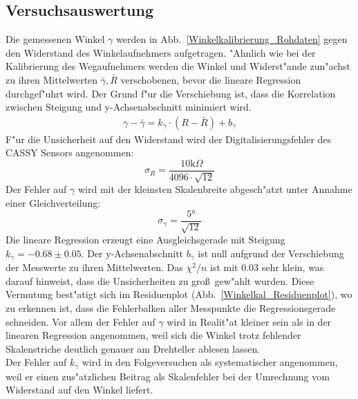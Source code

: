 \documentclass[12pt,a4paper]{article}
\begin{document}
\subsection{Versuchsauswertung}
Die gemessenen Winkel $\gamma$ werden in Abb.~\ref{Winkelkalibrierung_Rohdaten} gegen den Widerstand des Winkelaufnehmers aufgetragen. "Ahnlich wie bei der Kalibrierung des Wegaufnehmers werden die Winkel und Widerst"ande zun"achst zu ihren Mittelwerten $\bar{\gamma},\bar{R}$ verschobenen, bevor die lineare Regression durchgef"uhrt wird. Der Grund f"ur die Verschiebung ist, dass die Korrelation zwischen Steigung und y-Achsenabschnitt minimiert wird.
\begin{align}\label{eq:Winkelkal}
\gamma-\bar{\gamma}=k_{\gamma}\cdot (R-\bar{R}) + b_{\gamma}
\end{align}
F"ur die Unsicherheit auf den Widerstand wird der Digitalisierungsfehler des CASSY Sensors angenommen:
\begin{equation}
\sigma_R=\frac{10\text{k}\Omega}{4096\cdot\sqrt{12}}
\end{equation}
Der Fehler auf $\gamma$ wird mit der kleinsten Skalenbreite abgesch"atzt unter Annahme einer Gleichverteilung:
\begin{equation}
\sigma_{\gamma}=\frac{\ang{5}}{\sqrt{12}}
\end{equation}
Die lineare Regression erzeugt eine Ausgleichsgerade mit Steigung $k_{\gamma}=-0.68\pm0.05$. Der y-Achsenabschnitt $b_{\gamma}$ ist null aufgrund der Verschiebung der Messwerte zu ihren Mittelwerten. Das $\chi^2/n$ ist mit 0.03 sehr klein, was darauf hinweist, dass die Unsicherheiten zu gro\ss \ gew"ahlt wurden. Diese Vermutung best"atigt sich im Residuenplot (Abb.~\ref{Winkelkal_Residuenplot}), wo zu erkennen ist, dass die Fehlerbalken aller Messpunkte die Regressionsgerade schneiden. Vor allem der Fehler auf $\gamma$ wird in Realit"at kleiner sein als in der linearen Regression angenommen, weil sich die Winkel trotz fehlender Skalenstriche deutlich genauer am Drehteller ablesen lassen.\\
Der Fehler auf $k_{\gamma}$ wird in den Folgeversuchen als systematischer angenommen, weil er einen zus"atzlichen Beitrag als Skalenfehler bei der Umrechnung vom Widerstand auf den Winkel liefert.
\end{document}
